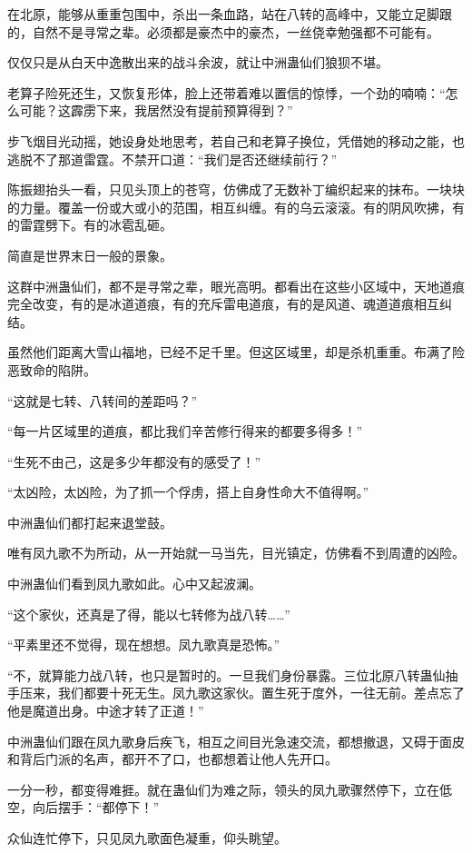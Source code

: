 \begin{this_body}
在北原，能够从重重包围中，杀出一条血路，站在八转的高峰中，又能立足脚跟的，自然不是寻常之辈。必须都是豪杰中的豪杰，一丝侥幸勉强都不可能有。

仅仅只是从白天中逸散出来的战斗余波，就让中洲蛊仙们狼狈不堪。

老算子险死还生，又恢复形体，脸上还带着难以置信的惊悸，一个劲的喃喃：“怎么可能？这霹雳下来，我居然没有提前预算得到？”

步飞烟目光动摇，她设身处地思考，若自己和老算子换位，凭借她的移动之能，也逃脱不了那道雷霆。不禁开口道：“我们是否还继续前行？”

陈振翅抬头一看，只见头顶上的苍穹，仿佛成了无数补丁编织起来的抹布。一块块的力量。覆盖一份或大或小的范围，相互纠缠。有的乌云滚滚。有的阴风吹拂，有的雷霆劈下。有的冰雹乱砸。

简直是世界末日一般的景象。

这群中洲蛊仙们，都不是寻常之辈，眼光高明。都看出在这些小区域中，天地道痕完全改变，有的是冰道道痕，有的充斥雷电道痕，有的是风道、魂道道痕相互纠结。

虽然他们距离大雪山福地，已经不足千里。但这区域里，却是杀机重重。布满了险恶致命的陷阱。

“这就是七转、八转间的差距吗？”

“每一片区域里的道痕，都比我们辛苦修行得来的都要多得多！”

“生死不由己，这是多少年都没有的感受了！”

“太凶险，太凶险，为了抓一个俘虏，搭上自身性命大不值得啊。”

中洲蛊仙们都打起来退堂鼓。

唯有凤九歌不为所动，从一开始就一马当先，目光镇定，仿佛看不到周遭的凶险。

中洲蛊仙们看到凤九歌如此。心中又起波澜。

“这个家伙，还真是了得，能以七转修为战八转……”

“平素里还不觉得，现在想想。凤九歌真是恐怖。”

“不，就算能力战八转，也只是暂时的。一旦我们身份暴露。三位北原八转蛊仙抽手压来，我们都要十死无生。凤九歌这家伙。置生死于度外，一往无前。差点忘了他是魔道出身。中途才转了正道！”

中洲蛊仙们跟在凤九歌身后疾飞，相互之间目光急速交流，都想撤退，又碍于面皮和背后门派的名声，都开不了口，也都想着让他人先开口。

一分一秒，都变得难捱。就在蛊仙们为难之际，领头的凤九歌骤然停下，立在低空，向后摆手：“都停下！”

众仙连忙停下，只见凤九歌面色凝重，仰头眺望。


\end{this_body}
